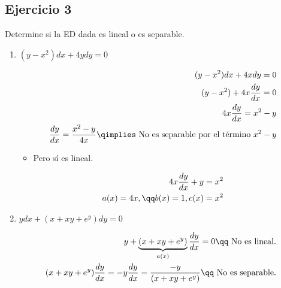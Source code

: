 \subsection{Ejercicio 3}
Determine si la ED dada es lineal o es separable.
\begin{enumerate}
    \item $\displaystyle (y-x^2)dx+4ydy = 0$
        \begin{center}
           \begin{align*}
               (y-x^2)dx+4xdy = 0 \\ 
               (y-x^2)+4x\frac{d y}{d x} =0 \\ 
               4x\frac{d y}{d x} = x^2-y \\ 
               \frac{d y}{d x} = \frac{x^2-y}{4x} \qimplies \text{ No es separable por el término $x^2-y$} \\ 
           \end{align*}
           \begin{itemize}
               \item Pero sí es lineal.
           \end{itemize}
           \begin{align*}
                4x\frac{d y}{d x}  + y = x^2 \\ 
                a(x) = 4x, \qq b(x) = 1, c(x) = x^2 \\ 
           \end{align*}
        \end{center}
    
    \item $\displaystyle ydx+(x+xy+e^y)dy=0$ 
        \begin{center}
           \begin{align*}
               y + \underbrace{(x+xy+e^y)}_{a(x)}\frac{d y}{d x} = 0 \qq \text{ No es lineal. } \\ 
               (x+xy+e^y)\frac{d y}{d x} = -y
               \frac{d y}{d x} = \frac{-y}{(x+xy+e^y)} \qq \text{ No es separable. } \\ 
           \end{align*}
        \end{center}
    

\end{enumerate}
